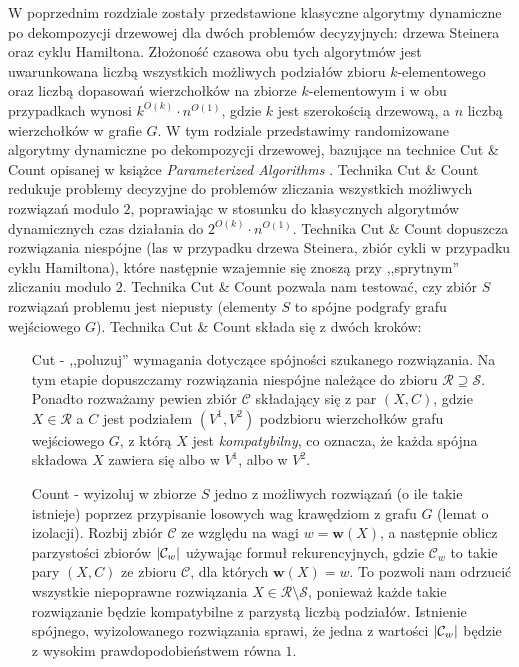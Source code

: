 \documentclass[12pt, oneside]{report}
\newcommand\Omicron{O}
\begin{document}
W poprzednim rozdziale zostały przedstawione klasyczne algorytmy dynamiczne po dekompozycji drzewowej dla dwóch problemów decyzyjnych: drzewa Steinera oraz cyklu Hamiltona. Złożoność czasowa obu tych algorytmów jest uwarunkowana liczbą wszystkich możliwych podziałów zbioru $k$-elementowego oraz liczbą dopasowań wierzchołków na zbiorze $k$-elementowym i w obu przypadkach wynosi $k^{\Omicron{(k)}} \cdot n^{\Omicron{(1)}}$, gdzie $k$ jest szerokością drzewową, a $n$ liczbą wierzchołków w grafie $G$.
W tym rodziale przedstawimy randomizowane algorytmy dynamiczne po dekompozycji drzewowej, bazujące na technice Cut \& Count opisanej w książce \emph{Parameterized Algorithms} \cite{parametrized_algorithms}. Technika Cut \& Count redukuje problemy decyzyjne do problemów zliczania wszystkich możliwych rozwiązań modulo $2$, poprawiając w stosunku do klasycznych algorytmów dynamicznych czas działania do $2^{\Omicron{(k)}} \cdot n^{\Omicron{(1)}}$. Technika Cut \& Count dopuszcza rozwiązania niespójne (las w przypadku drzewa Steinera, zbiór cykli w przypadku cyklu Hamiltona), które następnie wzajemnie się znoszą przy ,,sprytnym'' zliczaniu modulo $2$. Technika Cut \& Count pozwala nam testować, czy zbiór $S$ rozwiązań problemu jest niepusty (elementy $S$ to spójne podgrafy grafu wejściowego $G$).\newline\newline
Technika Cut \& Count składa się z dwóch kroków:

\begin{enumerate}

\item[Cut] - ,,poluzuj'' wymagania dotyczące spójności szukanego rozwiązania. Na tym etapie dopuszczamy rozwiązania niespójne należące do zbioru $\mathcal{R} \supseteq \mathcal{S}$. Ponadto rozważamy pewien zbiór $\mathcal{C}$ składający się z par $(X, C)$, gdzie $X \in \mathcal{R}$ a $C$ jest podziałem $(V^1, V^2)$ podzbioru wierzchołków grafu wejściowego $G$, z którą $X$ jest \emph{kompatybilny}, co oznacza, że każda spójna składowa $X$ zawiera się albo w $V^1$, albo w $V^2$.  

\item[Count] - wyizoluj w zbiorze $S$ jedno z możliwych rozwiązań (o ile takie istnieje) poprzez przypisanie losowych wag krawędziom z grafu $G$ (lemat o izolacji). Rozbij zbiór $\mathcal{C}$ ze względu na wagi $w = \mathbf{w}(X)$, a następnie oblicz parzystości zbiorów $\abs{\mathcal{C}_w}$ używając formuł rekurencyjnych, gdzie $\mathcal{C}_w$ to takie pary $(X,C)$ ze zbioru $\mathcal{C}$, dla których $\mathbf{w}(X) = w$. To pozwoli nam odrzucić wszystkie niepoprawne rozwiązania $X \in \mathcal{R} \setminus \mathcal{S}$, ponieważ każde takie rozwiązanie będzie kompatybilne z parzystą liczbą podziałów. Istnienie spójnego, wyizolowanego rozwiązania sprawi, że jedna z wartości $\abs{\mathcal{C}_w}$ będzie z wysokim prawdopodobieństwem równa $1$.

\end{enumerate}
\end{document}
